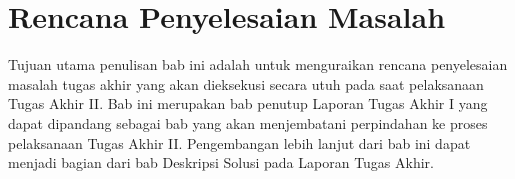 \chapter{Rencana Penyelesaian Masalah}

Tujuan utama penulisan bab ini adalah untuk menguraikan rencana penyelesaian masalah tugas akhir yang akan dieksekusi secara utuh pada saat pelaksanaan Tugas Akhir II. Bab ini merupakan bab penutup Laporan Tugas Akhir I yang dapat dipandang sebagai bab yang akan menjembatani perpindahan ke proses pelaksanaan Tugas Akhir II. Pengembangan lebih lanjut dari bab ini dapat menjadi bagian dari bab Deskripsi Solusi pada Laporan Tugas Akhir.

\blindtext